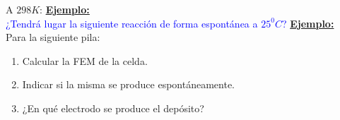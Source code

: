         A $298K$:
        \textbf{\underline{Ejemplo:}} \\[5pt]
        \sangria{}\textcolor{blue}{¿Tendrá lugar la siguiente reacción de forma espontánea a $25^0C$?}
        \textbf{\underline{Ejemplo:}} \\[5pt]
        Para la siguiente pila:
        \begin{enumerate}
            \item Calcular la FEM de la celda.
            \item Indicar si la misma se produce espontáneamente.
            \item ¿En qué electrodo se produce el depósito?
        \end{enumerate}
         \saltoPag{}
